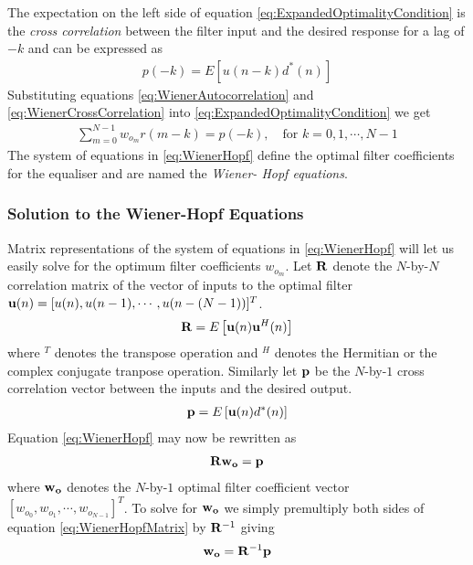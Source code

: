 The expectation on the left side of equation %
\ref{eq:ExpandedOptimalityCondition} is the %
\emph{cross correlation} between the filter %
input and the desired response for a lag %
of $-k$ and can be expressed as
\begin{align}
	p(-k) = E\left[u(n-k)d^{*}(n)\right]
	\label{eq:WienerCrossCorrelation}
\end{align}
Substituting equations \ref{eq:WienerAutocorrelation} %
and \ref{eq:WienerCrossCorrelation} into %
\ref{eq:ExpandedOptimalityCondition} %
we get
\begin{align}
	\sum_{m=0}^{N-1}w_{o_{m}}r(m-k)=p(-k),\quad
	\text{for }k=0,1,\cdots,N-1
	\label{eq:WienerHopf}
\end{align}
The system of equations in \ref{eq:WienerHopf} %
define the optimal filter coefficients for the %
equaliser and are named the \emph{Wiener-%
Hopf equations}.
\subsubsection{Solution to the Wiener-Hopf Equations}
Matrix representations of the system of equations in %
\ref{eq:WienerHopf} will let us easily solve for %
the optimum filter coefficients $w_{o_{m}}$. %
Let $\bold{R}$ denote the $N$-by-$N$ correlation %
matrix of the vector of inputs to the optimal filter %
$\bold{u}(n) = [u(n),u(n-1),\cdots,u(n-(N-1))]^T$.
\begin{align}
	\bold{R} = E\left[\bold{u}(n)\bold{u}^{H}(n)\right]
\end{align}
where $^{T}$ denotes the transpose operation and %
$^{H}$ denotes the Hermitian or the complex conjugate %
tranpose operation. Similarly let $\bold{p}$ be the %
$N$-by-$1$ cross correlation vector between %
the inputs and the desired output. 
\begin{align}
	\bold{p} = E\left[\bold{u}(n)d^{*}(n)\right]
\end{align}
Equation \ref{eq:WienerHopf} may now be rewritten %
as
\begin{align}
	\bold{R}\bold{w_{o}} = \bold{p}
	\label{eq:WienerHopfMatrix}
\end{align}
where $\bold{w_{o}}$ denotes the $N$-by-$1$ optimal %
filter coefficient vector $[w_{o_{0}},w_{o_{1}},%
\cdots,w_{o_{N-1}}]^T$. To solve for $\bold{w_{o}}$ %
we simply premultiply both sides of equation %
\ref{eq:WienerHopfMatrix} by $\bold{R}^{-1}$ giving
\begin{align}
	\bold{w_{o}} = \bold{R}^{-1}\bold{p}
	\label{eq:WienerHopfSolution}
\end{align}
